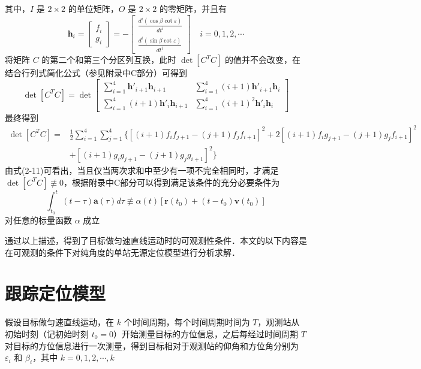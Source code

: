 其中，$I$ 是 $2 \times 2$ 的单位矩阵，$O$ 是 $2 \times 2$ 的零矩阵，并且有
\begin{equation}
	\bm{h}_i = \left[\begin{array}{c}
		f_i \\ g_i
	\end{array}\right] = - \left[\begin{array}{c}
	\frac{d^i(\cos\beta\cot\varepsilon)}{dt^i} \\
	\frac{d^i(\sin\beta\cot\varepsilon)}{dt^i}
\end{array}\right] \quad i=0,1,2,\cdots
\end{equation}
将矩阵 $C$ 的第二个和第三个分区列互换，此时 $\det[C^TC]$ 的值并不会改变，在结合行列式简化公式（参见附录中C部分）可得到
\begin{equation}
	\det[C^TC] = \det \left[\begin{array}{cc}
		\sum_{i=1}^{4}\bm{h}'_{i+1}\bm{h}_{i+1} & \sum_{i=1}^{4}(i+1)\bm{h}'_{i+1}\bm{h}_i \\
		\sum_{i=1}^{4} (i+1)\bm{h}'_{i}\bm{h}_{i+1} & \sum_{i=1}^{4}(i+1)^2\bm{h}'_i\bm{h}_i
	\end{array}\right]
\end{equation}
最终得到
\begin{equation}
	\begin{split}
		\det[C^TC] =& \frac{1}{2}\sum_{i=1}^{4}\sum_{j=1}^{4}\lbrace [(i+1)f_i f_{j+1} - (j+1)f_j f_{i+1}]^2 + 2[(i+1)f_i g_{j+1} - (j+1) g_j f_{i+1}]^2 \\
		&+ [(i+1)g_i g_{j+1} - (j+1)g_j g_{i+1}]^2 \rbrace
	\end{split}	
\end{equation}
由式(2-11)可看出，当且仅当两次求和中至少有一项不完全相同时，才满足 $\det[C^TC] \not \equiv 0$，根据附录中C部分可以得到满足该条件的充分必要条件为
\begin{equation}
	\int_{t_0}^{t}(t-\tau)\bm{a}(\tau)d\tau \not \equiv \alpha(t)[\bm{r}(t_0)+(t-t_0)\bm{v}(t_0)]
\end{equation}
对任意的标量函数 $\alpha$ 成立

通过以上描述，得到了目标做匀速直线运动时的可观测性条件．本文的以下内容是在可观测的条件下对纯角度的单站无源定位模型进行分析求解．
\section{跟踪定位模型}
假设目标做匀速直线运动，在 $k$ 个时间周期，每个时间周期时间为 $T$，观测站从初始时刻（记初始时刻 $t_0=0$）开始测量目标的方位信息，之后每经过时间周期 $T$ 对目标的方位信息进行一次测量，得到目标相对于观测站的仰角和方位角分别为 $\varepsilon_i$ 和 $\beta_i$，其中 $k = 0,1,2,\cdots,k$ 

